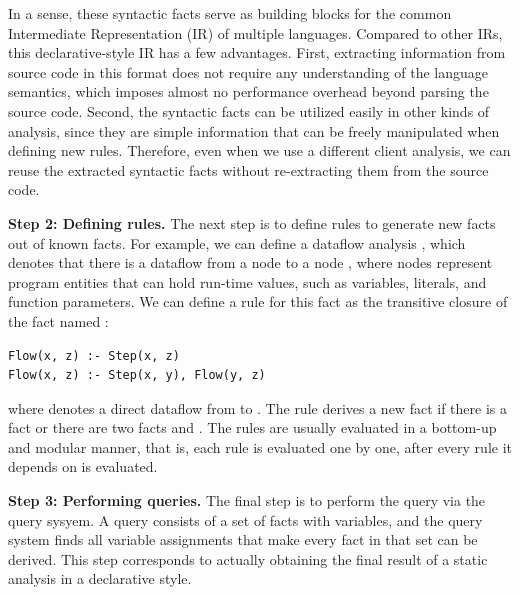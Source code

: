 In a sense, these syntactic facts serve as building blocks for the
common Intermediate Representation (IR) of multiple languages.
Compared to other IRs, this declarative-style IR has a few advantages.
First, extracting information from source code in this format does not
require any understanding of the language semantics, which imposes
almost no performance overhead beyond parsing the source code.
Second, the syntactic facts can be utilized easily in other kinds of
analysis, since they are simple information that can be freely
manipulated when defining new rules. Therefore, even when we use a different
client analysis, we can reuse the extracted syntactic facts
without re-extracting them from the source code.

\smallskip
\textbf{Step 2: Defining rules.}
The next step is to define rules to generate new facts out of known facts.
 For example, we can define a dataflow
analysis ,  which denotes that there is a dataflow from a node 
to a node , where nodes represent program entities that can hold
run-time values, such as variables, literals, and function parameters.  We
can define a rule for this fact as the transitive closure of the fact named
:

\begin{lstlisting}[style=mrule]
Flow(x, z) :- Step(x, z)
Flow(x, z) :- Step(x, y), Flow(y, z)
\end{lstlisting}

\noindent
where  denotes a direct dataflow from  to . The
rule derives a new fact  if there is a fact  or
there are two facts  and .
The rules are usually
evaluated in a bottom-up and modular manner, that is, each rule is evaluated
one by one, after every rule it depends on is evaluated.


\smallskip
\textbf{Step 3: Performing queries.}
The final step is to perform the query via the query sysyem.  A query consists
of a set of facts with variables, and the query system finds all variable
assignments that make every fact in that set can be derived. This step corresponds
to actually obtaining the final result of a static analysis in a declarative
style. 

